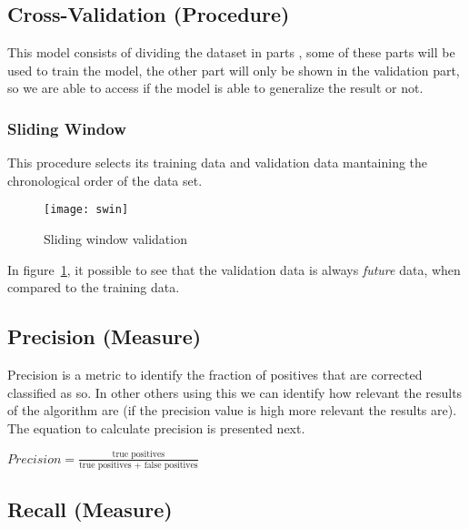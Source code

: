 \subsection{Cross-Validation (Procedure)}

This model consists of dividing the dataset in parts \cite{Witten:2005:DMP:1205860}
, some of these parts will be used to train the model, the other part will only
be shown in the validation part, so we are able to access if the model is able to
generalize the result or not. 

\subsubsection{Sliding Window}

This procedure selects its training data and validation data mantaining the
chronological order of the data set\cite{Bensch_self-learningprediction}.

\begin{figure}[!h]
  \begin{center}
    \leavevmode
    \texttt{[image: swin]}
    \caption{Sliding window validation}\cite{Bensch_self-learningprediction}
    \label{fig:swin}
  \end{center}
\end{figure}
\FloatBarrier

In figure~\ref{fig:swin}, it possible to see that the validation data is always
\textit{future} data, when compared to the training data.


\subsection{Precision (Measure)}

Precision is a metric to identify the fraction of positives that are corrected
classified as so. In other others using this we can identify how relevant the
results of the algorithm are (if the precision value is high more relevant the
results are). The equation to calculate precision is presented next.

\begin{center}
\Large
\begin{math}
Precision = \frac{\text{true positives}}{\text{true positives + false positives}}
\end{math}
\normalsize
\end{center}


\subsection{Recall (Measure)}

